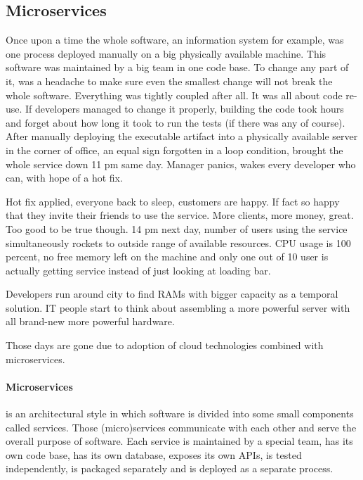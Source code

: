 \documentclass[a4]{report}
\begin{document}
    \subsection{Microservices}
    Once upon a time the whole software, an information system for example, was one process deployed manually on a big
    physically available machine.
    This software was maintained by a big team in one code base.
    To change any part of it, was a headache to make sure even the smallest change will not break the whole software.
    Everything was tightly coupled after all.
    It was all about code re-use.
    If developers managed to change it properly, building the code took hours and forget about how long it took to
    run the tests (if there was any of course).
    After manually deploying the executable artifact into a physically available server in the corner of office, an
    equal sign forgotten in a loop condition, brought the whole service down 11 pm same day.
    Manager panics, wakes every developer who can, with hope of a hot fix.

    Hot fix applied, everyone back to sleep, customers are happy.
    If fact so happy that they invite their friends to use the service.
    More clients, more money, great.
    Too good to be true though.
    14 pm next day, number of users using the service simultaneously rockets to outside range of available resources.
    CPU usage is 100 percent, no free memory left on the machine and only one out of 10 user is actually getting
    service instead of just looking at loading bar.

    Developers run around city to find RAMs with bigger capacity as a temporal solution.
    IT people start to think about assembling a more powerful server with all brand-new more powerful hardware.

    Those days are gone due to adoption of cloud technologies combined with microservices.

    \paragraph{Microservices} is an architectural style in which software is divided into some small components
    called services.
    Those (micro)services communicate with each other and serve the overall purpose of software.
    Each service is maintained by a special team, has its own code base, has its own database, exposes its own APIs, is
    tested independently, is packaged separately and is deployed as a separate process.
\end{document}
